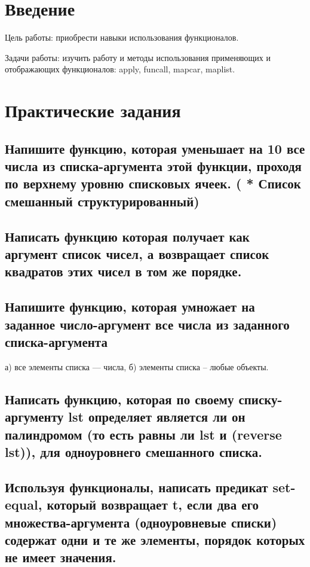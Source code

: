 \documentclass[a4paper, 14pt, unknownkeysallowed]{extreport}
\begin{document}

\setcounter{page}{2}

\chapter*{Введение}
Цель работы: приобрести навыки использования функционалов.

Задачи работы: изучить работу и методы использования применяющих и
отображающих функционалов: apply, funcall, mapcar, maplist.

\chapter{Практические задания}

\section{Напишите функцию, которая уменьшает на 10 все числа из списка-аргумента этой 
	функции, проходя по верхнему уровню списковых ячеек. ( * Список смешанный 
	структурированный)}

\section{Написать функцию которая получает как аргумент список чисел, а возвращает список 
	квадратов этих чисел в том же порядке.}


\section {Напишите функцию, которая умножает на заданное число-аргумент все числа из 
заданного списка-аргумента}
а) все элементы списка --- числа,
б) элементы списка -- любые объекты.


\section{Написать функцию, которая по своему списку-аргументу lst определяет является ли он
	палиндромом (то есть равны ли lst и (reverse lst)), для одноуровнего смешанного 
	списка.}

\clearpage
{}

\section{Используя функционалы, написать предикат set-equal, который возвращает t, если два 
	его множества-аргумента (одноуровневые списки) содержат одни и те же элементы, 
	порядок которых не имеет значения.}
\end{document}
